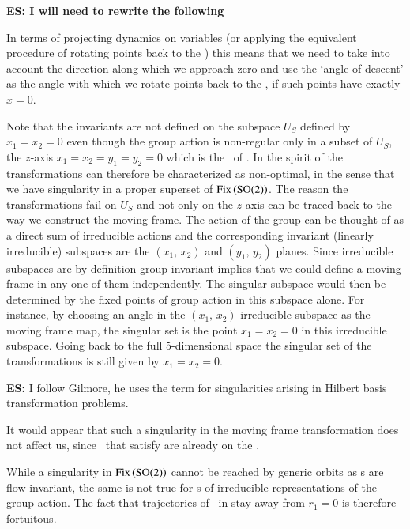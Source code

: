 {\bf ES: I will need to rewrite the following}

In terms of projecting dynamics
on variables  (or applying the equivalent
procedure of rotating points back to the \slice) this means that
we need to take into account the direction along which
we approach zero and use the `angle
of descent' as the angle with which we rotate points back to the \slice, if such
points have exactly $x=0$.

Note that the invariants are not defined on
the subspace $U_S$ defined by $x_1=x_2=0$ even though the
group action is non-regular only in a subset of $U_S$, the
$z$-axis $x_1=x_2=y_1=y_2=0$ which is the \fixedsp\ of .
In the spirit of  the transformations 
can therefore be characterized as non-optimal, in the sense
that we have singularity in a proper superset of $\mathrm{Fix}\left(\textrm{SO}(2)\right)$.
The reason the transformations fail on $U_S$ and not only on the $z$-axis
can be traced back to the way we construct the moving frame. The action
of the group can be thought of as a direct sum of irreducible
actions and the corresponding invariant (linearly irreducible)
subspaces are the $(x_1,\,x_2)$ and $(y_1,\,y_2)$
planes.
Since irreducible subspaces are by definition group-invariant
implies that we could define a moving frame in any one of
them independently. The singular subspace would then be
determined by the fixed points of group action in this
subspace alone. For instance, by choosing an angle in the
$(x_1,\,x_2)$ irreducible subspace as the moving frame map,
the singular set is the point $x_1=x_2=0$ in this irreducible
subspace. Going back to the full $5$-dimensional space the
singular set of the transformations is still given by
$x_1=x_2=0$.

{\bf ES:} I follow Gilmore, he uses the term for
singularities arising in Hilbert basis transformation
problems.

It would appear
that such a singularity in the moving frame transformation
does not affect us, since \ssp\ that satisfy
 are already on the \slice.

While a singularity in $\mathrm{Fix}\left(\textrm{SO}(2)\right)$ cannot be reached by
generic orbits as {\fixedsp s} are flow invariant, the same
is not true for {\fixedsp s} of irreducible representations
of the group action. The fact that
trajectories of \cLf\ in  stay away from
$r_1=0$ is therefore fortuitous.

